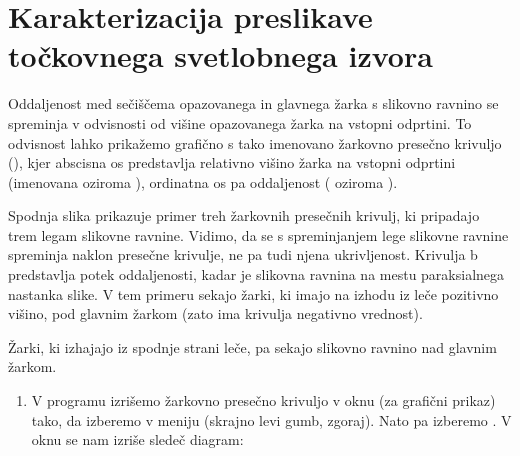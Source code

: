 \documentclass[letterpaper,10pt,english]{sphinxmanual}
\begin{document}
\section{Karakterizacija preslikave točkovnega svetlobnega izvora}
\label{\detokenize{oslo:karakterizacija-preslikave-tockovnega-svetlobnega-izvora}}
\sphinxAtStartPar
Oddaljenost med sečiščema opazovanega in glavnega žarka s slikovno ravnino se spreminja v odvisnosti od višine opazovanega žarka na vstopni odprtini. To odvisnost lahko prikažemo grafično s tako imenovano žarkovno presečno krivuljo (), kjer abscisna os predstavlja relativno višino žarka na vstopni odprtini (imenovana  oziroma ), ordinatna os pa oddaljenost ( oziroma ).

\sphinxAtStartPar
Spodnja slika prikazuje primer treh žarkovnih presečnih krivulj, ki pripadajo trem legam slikovne ravnine. Vidimo, da se s spreminjanjem lege slikovne ravnine spreminja naklon presečne krivulje, ne pa tudi njena ukrivljenost. Krivulja b predstavlja potek oddaljenosti, kadar je slikovna ravnina na mestu paraksialnega nastanka slike. V tem primeru sekajo žarki, ki imajo na izhodu iz leče pozitivno višino, pod glavnim žarkom (zato ima krivulja negativno vrednost).

\sphinxAtStartPar
Žarki, ki izhajajo iz spodnje strani leče, pa sekajo slikovno ravnino nad glavnim žarkom.

\begin{figure}[htbp]
\centering

\noindent{}
\end{figure}
\begin{enumerate}
%
\item {} 
\sphinxAtStartPar
V programu  izrišemo žarkovno presečno krivuljo v oknu  (za grafični prikaz) tako, da izberemo  v meniju  (skrajno levi gumb, zgoraj). Nato pa izberemo . V oknu se nam izriše sledeč diagram:

\end{enumerate}

\begin{figure}[htbp]
\centering

\noindent{}
\end{figure}
\end{document}
